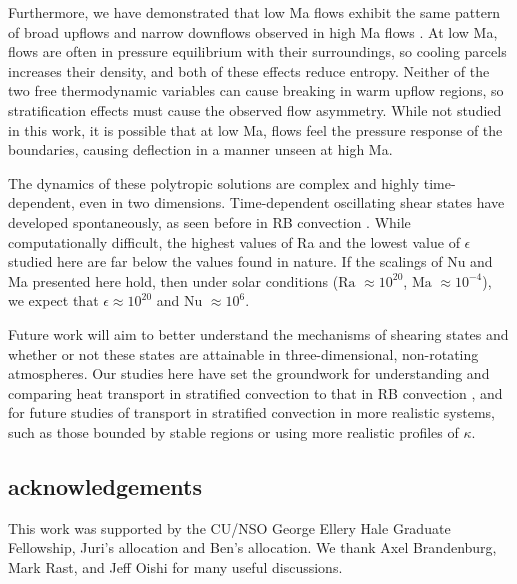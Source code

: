 \documentclass[aps, prl, twocolumn, nofootinbib, groupedaddress, amsfonts, amssymb, amsmath]{revtex4-1}
\begin{document}
Furthermore, we have demonstrated that low Ma flows exhibit the same pattern of broad upflows and narrow downflows
observed in high Ma flows \cite{hurlburt&all1984}.  At low Ma, flows are often in pressure equilibrium
with their surroundings, so cooling parcels increases their density, and both of these effects reduce
entropy.  Neither of the two free thermodynamic variables can cause breaking in warm upflow regions, 
so stratification effects must cause the observed flow asymmetry.
While not studied in this work, it is possible that at low Ma, flows feel the pressure response of the
boundaries, causing deflection in a manner unseen at high Ma.

The dynamics of these polytropic solutions are complex and highly time-dependent, even in two dimensions.
Time-dependent oscillating shear states have developed spontaneously, as seen before in RB convection
\cite{goluskin&all2014}.  While computationally difficult, the highest values of Ra and the lowest value
of $\epsilon$ studied here are far below the values found in nature.  If the scalings of Nu and Ma
presented here hold, then under solar conditions ($\text{Ra }\approx 10^{20}$, $\text{Ma }\approx 10^{-4}$), we expect that $\epsilon \approx 10^{20}$ and
$\text{Nu }\approx 10^{6}$. 

Future work will aim to better understand the mechanisms of shearing states and
whether or not these states are attainable in three-dimensional, non-rotating atmospheres.  Our studies
here have set the groundwork for understanding and comparing heat transport in stratified convection
to that in RB convection \cite{johnston&doering2009}, and for future studies of transport in stratified
convection in more realistic systems, such as those bounded by stable regions \cite{hurlburt&all2009} or 
using more realistic profiles of $\kappa$.



\subsection{acknowledgements}
This work was supported by the CU/NSO George Ellery Hale Graduate Fellowship,
Juri's allocation and Ben's allocation.
We thank Axel Brandenburg, Mark Rast, and Jeff Oishi for many useful discussions.


\end{document}
